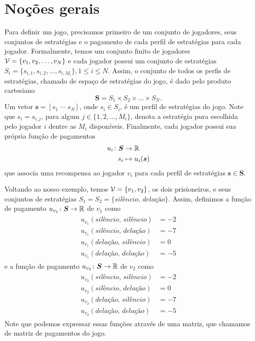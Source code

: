 
\section{Noções gerais}

Para definir um jogo, precisamos primeiro de um conjunto de jogadores, seus conjuntos de estratégias e o pagamento de cada perfil de estratégias para cada jogador. Formalmente, temos um conjunto finito de jogadores $\mathcal{V}=\{v_1,v_2,\dots,v_N\}$ e cada jogador possui um conjunto de estratégias $S_i=\{s_{i,1},s_{i,2},\dots,s_{i,M_i}\},1\leq i\leq N$. Assim, o conjunto de todos os perfis de estratégias, chamado de espaço de estratégias do jogo, é dado pelo produto cartesiano
\begin{equation}
\label{defS}
    \boldsymbol{S}=S_1\times S_2\times\dots\times S_N.
\end{equation}
Um vetor $\boldsymbol{s}=[ s_1 \; \cdots \; s_N]$, onde $s_i\in S_i$, é um perfil de estratégias do jogo. Note que $s_i=s_{i,j}$, para algum $j\in\{1,2,\dots,M_i\}$, denota a estratégia pura escolhida pelo jogador $i$ dentre as $M_i$ disponíveis. Finalmente, cada jogador possui sua própria função de pagamentos 
\begin{align}
\label{defU}
\begin{split}
    u_i \colon \boldsymbol{S} &\to \mathbb{R}\\
    s_i &\mapsto u_i(\boldsymbol{s})
\end{split}
\end{align}
que associa uma recompensa ao jogador $v_i$ para cada perfil de estratégias ${\boldsymbol{s}\in \boldsymbol{S}}$.

Voltando ao nosso exemplo, temos $\mathcal{V}=\{v_1,v_2\}$, os dois prisioneiros, e seus conjuntos de estratégias $S_1=S_2=\{\textit{silêncio, delação}\}$. Assim, definimos a função de pagamento $u_{v_1}\colon\boldsymbol{S}\to\mathbb{R}$ de $v_1$ como
\begin{align}
\label{pagp1}
\begin{split}
    u_{v_1}(\textit{silêncio, silêncio})&=-2 \\
    u_{v_1}(\textit{silêncio, delação})&=-7 \\
    u_{v_1}(\textit{delação, silêncio})&=0 \\
    u_{v_1}(\textit{delação, delação})&=-5
\end{split}
\end{align}
e a função de pagamento $u_{v_2}\colon\boldsymbol{S}\to\mathbb{R}$ de $v_2$ como
\begin{align}
\label{pagp2}
\begin{split}
    u_{v_2}(\textit{silêncio, silêncio})&=-2 \\
    u_{v_2}(\textit{silêncio, delação})&=0 \\
    u_{v_2}(\textit{delação, silêncio})&=-7 \\
    u_{v_2}(\textit{delação, delação})&=-5
\end{split}
\end{align}
Note que podemos expressar essas funções através de uma matriz, que chamamos de matriz de pagamentos do jogo.

